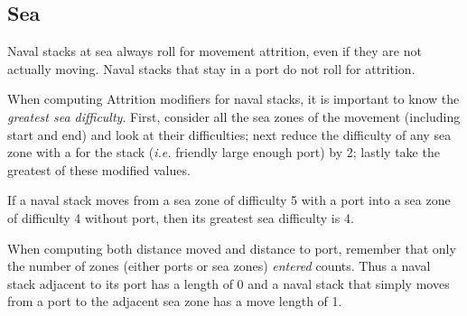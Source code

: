 \subsection{Sea}
Naval stacks at sea always roll for movement attrition, even if they are not
actually moving. Naval stacks that stay in a port do not roll for attrition.

When computing Attrition modifiers for naval stacks, it is important to know
the \emph{greatest sea difficulty}. First, consider all the sea zones of the
movement (including start and end) and look at their difficulties; next reduce
the difficulty of any sea zone with a \SoS for the stack (\emph{i.e.} friendly
large enough port) by 2; lastly take the greatest of these modified values.

\begin{exemple}
  If a naval stack moves from a sea zone of difficulty 5 with a port into a
  sea zone of difficulty 4 without port, then its greatest sea difficulty is
  4.
\end{exemple}

When computing both distance moved and distance to port, remember that only
the number of zones (either ports or sea zones) \emph{entered} counts. Thus a
naval stack adjacent to its port has a \LoS length of 0 and a naval stack that
simply moves from a port to the adjacent sea zone has a move length of 1.

